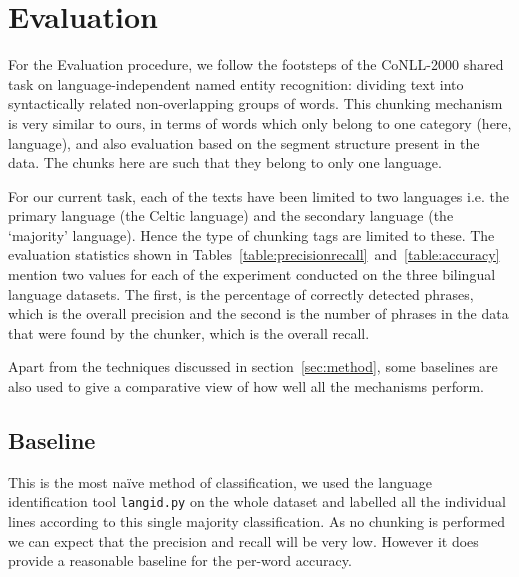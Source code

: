 \documentclass[11pt]{article}
\begin{document}

\vspace{-0.2cm}

\section{Evaluation}
\label{sec:eval}

For the Evaluation procedure, we follow the footsteps of the CoNLL-2000 shared task on language-independent 
named entity recognition: dividing text into syntactically related non-overlapping groups of words. This 
chunking mechanism \cite{tjong2003introduction} is very similar to ours, in terms of words which only belong to 
one category (here, language), and also evaluation based on the segment structure present in the data. The chunks 
here are such that they belong to only one language. 

For our current task, each of the texts have been limited to two languages i.e. the primary language (the Celtic language) and the 
secondary language (the `majority' language). Hence the type of chunking tags are limited to these. The evaluation statistics shown 
in Tables~\ref{table:precisionrecall}~and~\ref{table:accuracy} mention two values for each of the experiment conducted on the three bilingual 
language datasets. The first, is the percentage of correctly detected phrases, which is the overall precision and the second is the 
number of phrases in the data that were found by the chunker, which is the overall recall. 

Apart from the techniques discussed in section~\ref{sec:method}, some baselines are also used to give a comparative view of how well all the mechanisms perform.

\subsection{Baseline}
\label{baseline}

This is the most na\"{i}ve method of classification, we used the language identification tool \texttt{langid.py} \cite{lui2012langid} on the whole dataset and labelled all the individual lines according to this single majority classification. As no chunking is performed we can expect that the precision and recall will be very low. However it does provide a reasonable baseline for the per-word accuracy.  
\end{document}
